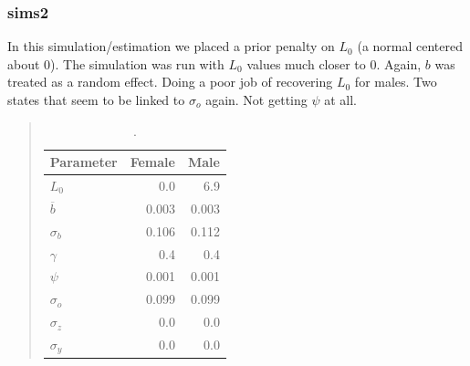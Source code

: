 \documentclass[11pt, a4paper]{article}
\begin{document}
\subsubsection{sims2}
In this simulation/estimation we placed a prior penalty on $L_0$ (a normal
centered about 0).  The simulation was run with $L_0$ values much closer to 0.
Again, $b$ was treated as a random effect.  Doing a poor job of recovering
$L_0$ for males.  Two states that seem to be linked to $\sigma_o$ again.  Not
getting $\psi$ at all.
\begin{table}[!htbp]
  \begin{quote}
  \caption{\label{tab:} .} \small{
  \begin{center}
  \begin{tabular}{lrr}
  \hline
  Parameter      & Female & Male\\
  \hline
  $L_0$          & 0.0   & 6.9\\
  $\overline{b}$ & 0.003 & 0.003\\
  $\sigma_b$     & 0.106 & 0.112\\
  $\gamma$       & 0.4   & 0.4\\
  $\psi$         & 0.001 & 0.001\\
  $\sigma_o$     & 0.099 & 0.099\\
  $\sigma_z$     & 0.0   & 0.0\\
  $\sigma_y$     & 0.0   & 0.0\\
  \hline
  \end{tabular}
  \end{center}
  }
  \end{quote}
\end{table}
\end{document}
